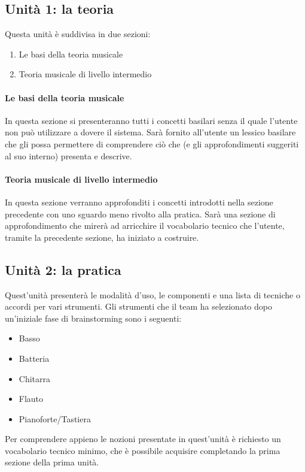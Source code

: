 \subsection{Unità 1: la teoria}
Questa unità è suddivisa in due sezioni:
\begin{enumerate}
	\item Le basi della teoria musicale
	\item Teoria musicale di livello intermedio
\end{enumerate}

\paragraph{Le basi della teoria musicale} In questa sezione si presenteranno tutti i concetti basilari senza il quale l'utente non può utilizzare a dovere il sistema. Sarà fornito all'utente un lessico basilare che gli possa permettere di comprendere ciò che \ProjectTitle{} (e gli approfondimenti suggeriti al suo interno) presenta e descrive.
\paragraph{Teoria musicale di livello intermedio} In questa sezione verranno approfonditi i concetti introdotti nella sezione precedente con uno sguardo meno rivolto alla pratica. Sarà una sezione di approfondimento che mirerà ad arricchire il vocabolario tecnico che l'utente, tramite la precedente sezione, ha iniziato a costruire.

\subsection{Unità 2: la pratica}
Quest'unità presenterà le modalità d'uso, le componenti e una lista di tecniche o accordi per vari strumenti. Gli strumenti che il team ha selezionato dopo un'iniziale fase di brainstorming sono i seguenti:
\begin{itemize}
	\item Basso
	\item Batteria
	\item Chitarra
	\item Flauto
	\item Pianoforte/Tastiera
\end{itemize}
Per comprendere appieno le nozioni presentate in quest'unità è richiesto un vocabolario tecnico minimo, che è possibile acquisire completando la prima sezione della prima unità.

